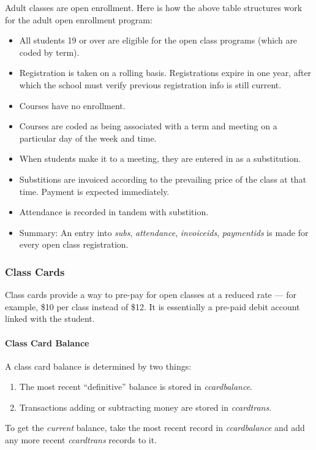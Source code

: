 \documentclass[11pt]{article}
\begin{document}
Adult classes are open enrollment.  Here is how the above table structures work for the adult open enrollment program:
 \begin{itemize}
 \item All students 19 or over are eligible for the open class programs (which are coded by term).
 \item Registration is taken on a rolling basis.  Registrations expire in one year, after which the school must verify previous registration info is still current.
 \item Courses have no enrollment.
 \item Courses are coded as being associated with a term and meeting on a particular day of the week and time.
 \item When students make it to a meeting, they are entered in as a substitution.
 \item Substitions are invoiced according to the prevailing price of the class at that time.  Payment is expected immediately.
 \item Attendance is recorded in tandem with substition.
 \item Summary: An entry into \emph{subs}, \emph{attendance}, \emph{invoiceids}, \emph{paymentids} is made for every open class registration.
 \end{itemize}

\subsubsection{Class Cards}

Class cards provide a way to pre-pay for open classes at a reduced rate --- for example, \$10 per class instead of \$12.  It is essentially a pre-paid debit account linked with the student.

\paragraph{Class Card Balance}

A class card balance is determined by two things:
 \begin{enumerate}
 \item The most recent ``definitive'' balance is stored in \emph{ccardbalance}.
 \item Transactions adding or subtracting money are stored in \emph{ccardtrans}. \end{enumerate}

To get the \emph{current} balance, take the most recent record in \emph{ccardbalance} and add any more recent \emph{ccardtrans} records to it.
\end{document}
